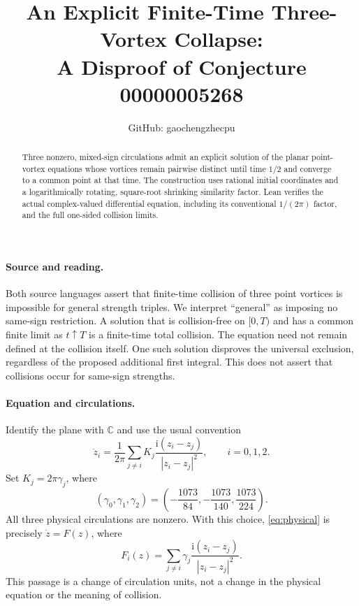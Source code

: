 \documentclass[11pt]{article}
\title{An Explicit Finite-Time Three-Vortex Collapse:\\A Disproof of Conjecture 00000005268}
\author{GitHub: gaochengzhecpu}
\date{}
\begin{document}
\maketitle
\begin{abstract}
Three nonzero, mixed-sign circulations admit an explicit solution of the
planar point-vortex equations whose vortices remain pairwise distinct
until time $1/2$ and converge to a common point at that time. The
construction uses rational initial coordinates and a logarithmically
rotating, square-root shrinking similarity factor. Lean verifies the
actual complex-valued differential equation, including its conventional
$1/(2\pi)$ factor, and the full one-sided collision limits.
\end{abstract}

\paragraph{Source and reading.}
Both source languages assert that finite-time collision of three point
vortices is impossible for general strength triples. We interpret
``general'' as imposing no same-sign restriction. A solution that is
collision-free on $[0,T)$ and has a common finite limit as $t\uparrow T$
is a finite-time total collision. The equation need not remain defined
at the collision itself. One such solution disproves the universal
exclusion, regardless of the proposed additional first integral.
This does not assert that collisions occur for same-sign strengths.

\paragraph{Equation and circulations.}
Identify the plane with $\mathbb C$ and use the usual convention
\begin{equation}\label{eq:physical}
 \dot z_i=\frac{1}{2\pi}\sum_{j\ne i}
 K_j\frac{\mathrm i(z_i-z_j)}{|z_i-z_j|^2},\qquad i=0,1,2.
\end{equation}
Set $K_j=2\pi\gamma_j$, where
\[
 (\gamma_0,\gamma_1,\gamma_2)
 =\left(-\frac{1073}{84},-\frac{1073}{140},\frac{1073}{224}\right).
\]
All three physical circulations are nonzero. With this choice,
\eqref{eq:physical} is precisely $\dot z=F(z)$, where
\[
 F_i(z)=\sum_{j\ne i}\gamma_j
 \frac{\mathrm i(z_i-z_j)}{|z_i-z_j|^2}.
\]
This passage is a change of circulation units, not a change in the
physical equation or the meaning of collision.
\end{document}
